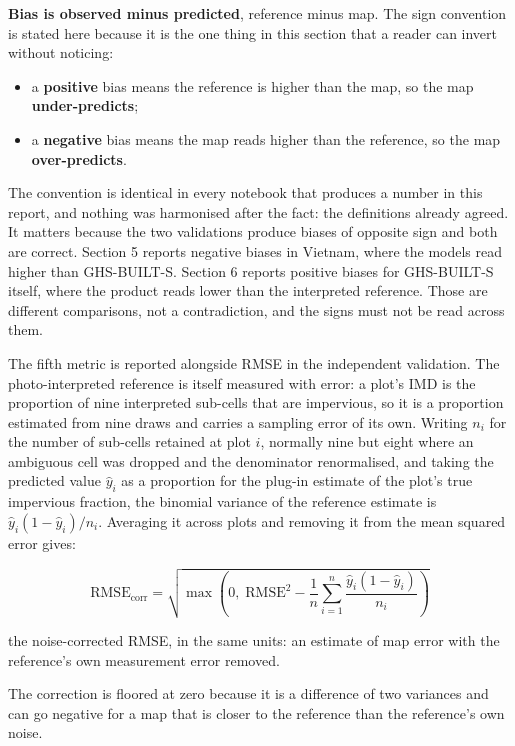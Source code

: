 \documentclass[11pt,a4paper]{article}
\begin{document}
\textbf{Bias is observed minus predicted}, reference minus map. The sign convention
is stated here because it is the one thing in this section that a reader can
invert without noticing:

\begin{itemize}
  \item a \textbf{positive} bias means the reference is higher than the map, so the map
        \textbf{under-predicts};
  \item a \textbf{negative} bias means the map reads higher than the reference, so the map
        \textbf{over-predicts}.
\end{itemize}

The convention is identical in every notebook that produces a number in this
report, and nothing was harmonised after the fact: the definitions already
agreed. It matters because the two validations produce biases of opposite sign
and both are correct. Section 5 reports negative biases in Vietnam, where the
models read higher than GHS-BUILT-S. Section 6 reports positive biases for
GHS-BUILT-S itself, where the product reads lower than the interpreted
reference. Those are different comparisons, not a contradiction, and the signs
must not be read across them.

The fifth metric is reported alongside RMSE in the independent validation. The
photo-interpreted reference is itself measured with error: a plot's IMD is the
proportion of nine interpreted sub-cells that are impervious, so it is a
proportion estimated from nine draws and carries a sampling error of its own.
Writing $n_i$ for the number of sub-cells retained at plot $i$, normally nine but
eight where an ambiguous cell was dropped and the denominator renormalised, and
taking the predicted value $\hat{y}_i$ as a proportion for the plug-in estimate of the
plot's true impervious fraction, the binomial variance of the reference estimate
is $\hat{y}_i(1 - \hat{y}_i)/n_i$. Averaging it across plots and removing it from the mean
squared error gives:

\begin{equation}
  \mathrm{RMSE}_{\mathrm{corr}} = \sqrt{\max\left(0,\;
    \mathrm{RMSE}^2 - \frac{1}{n}\sum_{i=1}^{n}
    \frac{\hat{y}_i\left(1 - \hat{y}_i\right)}{n_i}\right)}
\end{equation}

the noise-corrected RMSE, in the same units: an estimate of map error with the
reference's own measurement error removed.

The correction is floored at zero because it is a difference of two variances
and can go negative for a map that is closer to the reference than the
reference's own noise.
\end{document}

